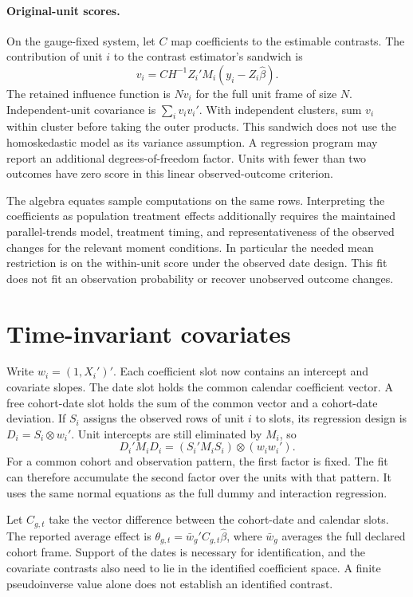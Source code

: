\documentclass[11pt]{article}
\begin{document}
\paragraph{Original-unit scores.}
On the gauge-fixed system, let \(C\) map coefficients to the estimable
contrasts. The contribution of unit \(i\) to the contrast estimator's
sandwich is
\[
  v_i = C H^{-1} Z_i'M_i(y_i-Z_i\widehat\beta).
\]
The retained influence function is \(N v_i\) for the full unit frame of
size \(N\). Independent-unit covariance is \(\sum_i v_iv_i'\). With
independent clusters, sum \(v_i\) within cluster before taking the outer
products. This sandwich does not use the homoskedastic model as its
variance assumption. A regression program may report an additional
degrees-of-freedom factor. Units with fewer than two outcomes have zero
score in this linear observed-outcome criterion.

The algebra equates sample computations on the same rows. Interpreting
the coefficients as population treatment effects additionally requires
the maintained parallel-trends model, treatment timing, and
representativeness of the observed changes for the relevant moment
conditions. In particular the needed mean restriction is on the
within-unit score under the observed date design. This fit does not
fit an observation probability or recover unobserved outcome changes.

\section{Time-invariant covariates}
Write \(w_i=(1,X_i')'\). Each coefficient slot now contains an intercept and
covariate slopes. The date slot holds the common calendar coefficient vector.
A free cohort-date slot holds the sum of the common vector and a cohort-date
deviation. If \(S_i\) assigns the observed rows of unit \(i\) to slots, its
regression design is \(D_i=S_i \otimes w_i'\). Unit intercepts are still
eliminated by \(M_i\), so
\[
  D_i'M_iD_i = (S_i'M_i S_i)\otimes(w_iw_i').
\]
For a common cohort and observation pattern, the first factor is fixed. The
fit can therefore accumulate the second factor over the units with that
pattern. It uses the same normal equations as the full dummy and interaction
regression.

Let \(C_{g,t}\) take the vector difference between the cohort-date and
calendar slots. The reported average effect is
\(\theta_{g,t}=\bar w_g' C_{g,t}\widehat\beta\), where \(\bar w_g\) averages
the full declared cohort frame. Support of the dates is necessary for
identification, and the covariate contrasts also need to lie in the
identified coefficient space. A finite pseudoinverse value alone does not
establish an identified contrast.
\end{document}
